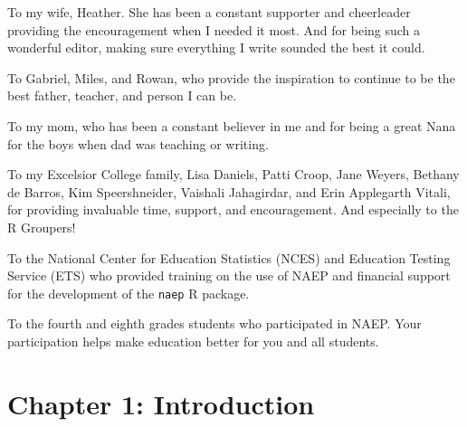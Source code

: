 \documentclass[letterpaper,12p,twoside]{article} %
\begin{document}
To my wife, Heather. She has been a constant supporter and cheerleader providing the encouragement when I needed it most.  And for being such a wonderful editor, making sure everything I write sounded the best it could.

To Gabriel, Miles, and Rowan, who provide the inspiration to continue to be the best father, teacher, and person I can be.

To my mom, who has been a constant believer in me and for being a great Nana for the boys when dad was teaching or writing.

To my Excelsior College family, Lisa Daniels, Patti Croop, Jane Weyers, Bethany de Barros, Kim Speershneider, Vaishali Jahagirdar, and Erin Applegarth Vitali, for providing invaluable time, support, and encouragement. And especially to the R Groupers!

To the National Center for Education Statistics (NCES) and Education Testing Service (ETS) who provided training on the use of NAEP and financial support for the development of the \texttt{naep} R package.

To the fourth and eighth grades students who participated in NAEP. Your participation helps make education better for you and all students.

\cleardoublepage

\setcounter{tocdepth}{5}
\tableofcontents
\clearpage
{}  \listoftables
\clearpage
{} \listoffigures


\cleardoublepage
{}
\setcounter{page}{1}
\section{Chapter 1: Introduction}
\end{document}
